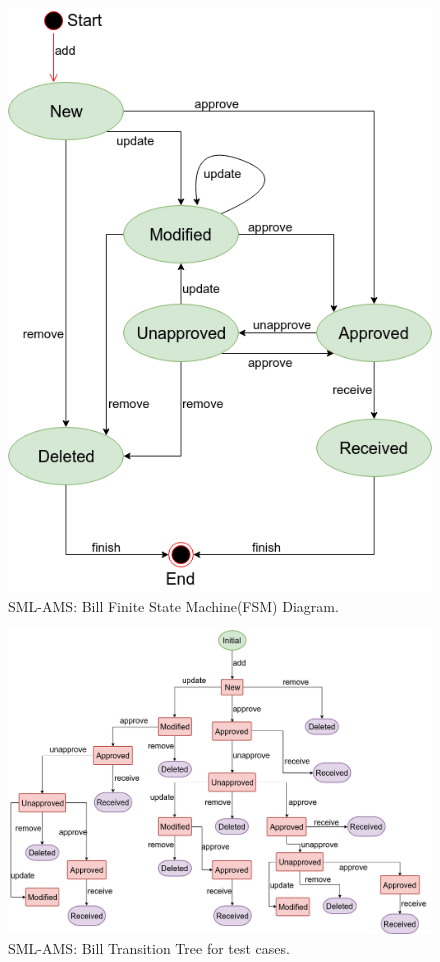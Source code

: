 \documentclass[12pt]{article}
\begin{document}
\begin{figure}

	\centering
    \includegraphics[scale=0.7]{SML-AMS-Bill-FSM-Diagram.png}
    \caption{SML-AMS: Bill Finite State Machine(FSM) Diagram.}
    \label{fig:bill-fsm-diagram}

\end{figure}

\begin{figure}

	\centering
    \includegraphics[scale=0.395]{SML-AMS-Bill-Transition-Tree.png}
    \caption{SML-AMS: Bill Transition Tree for test cases.}
    \label{fig:bill-transition-tree}

\end{figure}
\end{document}

